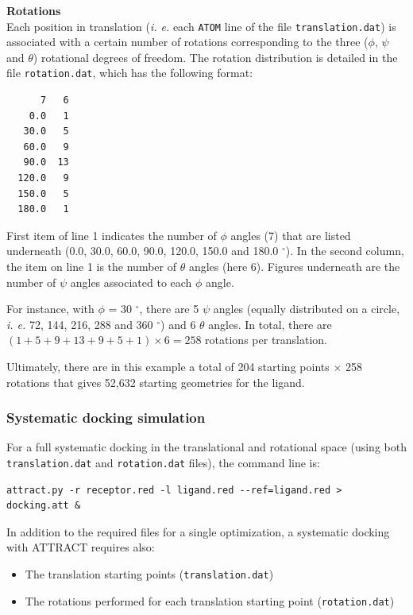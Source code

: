 \documentclass[12pt,a4paper]{article}
\begin{document}
\textbf{Rotations}\\
Each position in translation (\textit{i. e.} each {\tt ATOM} line of the file {\tt translation.dat})
is associated with a certain number of rotations corresponding to the three ($\phi$, $\psi$ and $\theta$) 
rotational degrees of freedom. The rotation distribution is detailed in the file {\tt rotation.dat},
which has the following format:

\newpage
\linenumbers*
\begin{verbatim}
      7   6
    0.0   1
   30.0   5
   60.0   9
   90.0  13
  120.0   9
  150.0   5
  180.0   1
\end{verbatim}
\nolinenumbers

First item of line 1 indicates the number of $\phi$ angles (7) that are listed underneath 
(0.0, 30.0, 60.0, 90.0, 120.0, 150.0 and 180.0 $^\circ$). In the second column, the item on line 1 is the number of $\theta$ angles (here 6). Figures underneath are the number of $\psi$ angles associated to each $\phi$ angle.

For instance, with $\phi$ = 30 $^\circ$, there are 5 $\psi$ angles (equally distributed on a circle, \textit{i. e.} 72, 144, 216, 288 and 360 $^\circ$) and 6 $\theta$ angles.
In total, there are $ (1 + 5 + 9 + 13 + 9 + 5 + 1) \times 6 = 258$ rotations per translation.

\bigskip
Ultimately, there are in this example a total of 204 starting points $\times$ 258 rotations 
that gives 52,632 starting geometries for the ligand.

\subsubsection{Systematic docking simulation}
For a full systematic docking in the translational and rotational space (using both {\tt translation.dat} and {\tt rotation.dat} files), the command line is:
\begin{verbatim}
attract.py -r receptor.red -l ligand.red --ref=ligand.red > docking.att &
\end{verbatim}

In addition to the required files for a single optimization, a systematic docking with ATTRACT requires also:
\begin{itemize}
\item The translation starting points ({\tt translation.dat})
\item The rotations performed for each translation starting point ({\tt rotation.dat})
\end{itemize}
\end{document}
